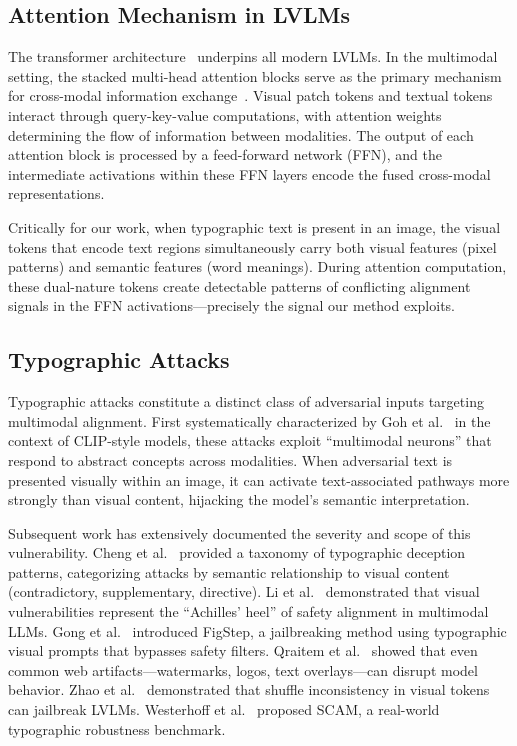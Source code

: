 \documentclass[preprint,12pt]{elsarticle}
\begin{document}
\subsection{Attention Mechanism in LVLMs}

The transformer architecture~\cite{vaswani2017attention} underpins all modern LVLMs. In the multimodal setting, the stacked multi-head attention blocks serve as the primary mechanism for cross-modal information exchange~\cite{chen2020uniter}. Visual patch tokens and textual tokens interact through query-key-value computations, with attention weights determining the flow of information between modalities. The output of each attention block is processed by a feed-forward network (FFN), and the intermediate activations within these FFN layers encode the fused cross-modal representations.

Critically for our work, when typographic text is present in an image, the visual tokens that encode text regions simultaneously carry both visual features (pixel patterns) and semantic features (word meanings). During attention computation, these dual-nature tokens create detectable patterns of conflicting alignment signals in the FFN activations---precisely the signal our method exploits.

\subsection{Typographic Attacks}

Typographic attacks constitute a distinct class of adversarial inputs targeting multimodal alignment. First systematically characterized by Goh et al.~\cite{goh2021multimodal} in the context of CLIP-style models, these attacks exploit ``multimodal neurons'' that respond to abstract concepts across modalities. When adversarial text is presented visually within an image, it can activate text-associated pathways more strongly than visual content, hijacking the model's semantic interpretation.

Subsequent work has extensively documented the severity and scope of this vulnerability. Cheng et al.~\cite{cheng2024unveiling} provided a taxonomy of typographic deception patterns, categorizing attacks by semantic relationship to visual content (contradictory, supplementary, directive). Li et al.~\cite{li2024images} demonstrated that visual vulnerabilities represent the ``Achilles' heel'' of safety alignment in multimodal LLMs. Gong et al.~\cite{gong2025figstep} introduced FigStep, a jailbreaking method using typographic visual prompts that bypasses safety filters. Qraitem et al.~\cite{qraitem2025web} showed that even common web artifacts---watermarks, logos, text overlays---can disrupt model behavior. Zhao et al.~\cite{zhao2025jailbreaking} demonstrated that shuffle inconsistency in visual tokens can jailbreak LVLMs. Westerhoff et al.~\cite{westerhoff2025scam} proposed SCAM, a real-world typographic robustness benchmark.
\end{document}
